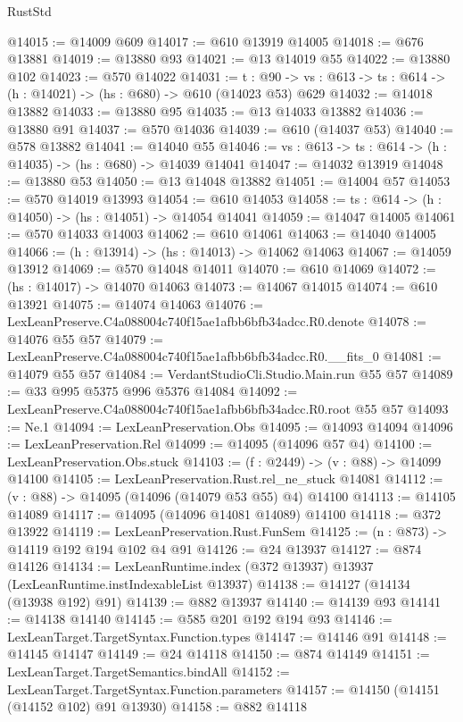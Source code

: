 \begin{lexlean}{RustStd}
\begin{coremodule}
@14015 := @14009 @609
@14017 := @610 @13919 @14005
@14018 := @676 @13881
@14019 := @13880 @93
@14021 := @13 @14019 @55
@14022 := @13880 @102
@14023 := @570 @14022
@14031 := {t : @90} ->
  {vs : @613} -> {ts : @614} -> (h : @14021) -> (hs : @680) -> @610 (@14023 @53) @629
@14032 := @14018 @13882
@14033 := @13880 @95
@14035 := @13 @14033 @13882
@14036 := @13880 @91
@14037 := @570 @14036
@14039 := @610 (@14037 @53)
@14040 := @578 @13882
@14041 := @14040 @55
@14046 := {vs : @613} -> {ts : @614} -> (h : @14035) -> (hs : @680) -> @14039 @14041
@14047 := @14032 @13919
@14048 := @13880 @53
@14050 := @13 @14048 @13882
@14051 := @14004 @57
@14053 := @570 @14019 @13993
@14054 := @610 @14053
@14058 := {ts : @614} -> (h : @14050) -> (hs : @14051) -> @14054 @14041
@14059 := @14047 @14005
@14061 := @570 @14033 @14003
@14062 := @610 @14061
@14063 := @14040 @14005
@14066 := (h : @13914) -> (hs : @14013) -> @14062 @14063
@14067 := @14059 @13912
@14069 := @570 @14048 @14011
@14070 := @610 @14069
@14072 := (hs : @14017) -> @14070 @14063
@14073 := @14067 @14015
@14074 := @610 @13921
@14075 := @14074 @14063
@14076 := LexLeanPreserve.C4a088004c740f15ae1afbb6bfb34adcc.R0.denote
@14078 := @14076 @55 @57
@14079 := LexLeanPreserve.C4a088004c740f15ae1afbb6bfb34adcc.R0.__fits_0
@14081 := @14079 @55 @57
@14084 := VerdantStudioCli.Studio.Main.run @55 @57
@14089 := @33 @995 @5375 @996 @5376 @14084
@14092 := LexLeanPreserve.C4a088004c740f15ae1afbb6bfb34adcc.R0.root @55 @57
@14093 := Ne.{1}
@14094 := LexLeanPreservation.Obs
@14095 := @14093 @14094
@14096 := LexLeanPreservation.Rel
@14099 := @14095 (@14096 @57 @4)
@14100 := LexLeanPreservation.Obs.stuck
@14103 := (f : @2449) -> (v : @88) -> @14099 @14100
@14105 := LexLeanPreservation.Rust.rel_ne_stuck @14081
@14112 := (v : @88) -> @14095 (@14096 (@14079 @53 @55) @4) @14100
@14113 := @14105 @14089
@14117 := @14095 (@14096 @14081 @14089) @14100
@14118 := @372 @13922
@14119 := LexLeanPreservation.Rust.FunSem
@14125 := (n : @873) -> @14119 @192 @194 @102 @4 @91
@14126 := @24 @13937
@14127 := @874 @14126
@14134 := LexLeanRuntime.index (@372 @13937) @13937 (LexLeanRuntime.instIndexableList @13937)
@14138 := @14127 (@14134 (@13938 @192) @91)
@14139 := @882 @13937
@14140 := @14139 @93
@14141 := @14138 @14140
@14145 := @585 @201 @192 @194 @93
@14146 := LexLeanTarget.TargetSyntax.Function.types
@14147 := @14146 @91
@14148 := @14145 @14147
@14149 := @24 @14118
@14150 := @874 @14149
@14151 := LexLeanTarget.TargetSemantics.bindAll
@14152 := LexLeanTarget.TargetSyntax.Function.parameters
@14157 := @14150 (@14151 (@14152 @102) @91 @13930)
@14158 := @882 @14118

\end{coremodule}
\end{lexlean}
